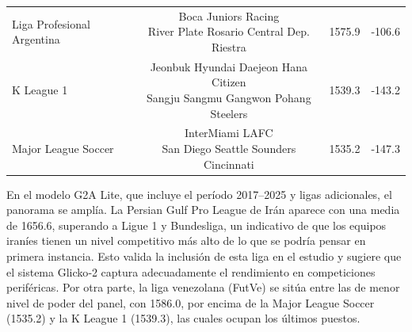 \begin{table}[htbp]
{\begin{tabular}{l c c c}
		Liga Profesional Argentina & \makecell[l]{Boca Juniors Racing \\ River Plate Rosario Central Dep. Riestra} & 1575.9 & -106.6 \\
		K League 1 & \makecell[l]{Jeonbuk Hyundai Daejeon Hana Citizen \\ Sangju Sangmu Gangwon Pohang Steelers} & 1539.3 & -143.2 \\
		Major League Soccer & \makecell[l]{InterMiami LAFC \\ San Diego Seattle Sounders Cincinnati} & 1535.2 & -147.3 \\
		\bottomrule
	\end{tabular}}%
\end{table}

En el modelo G2A Lite, que incluye el per\'iodo 2017--2025 y ligas adicionales, el panorama se ampl\'ia. La Persian Gulf Pro League de Ir\'an aparece con una media de 1656.6, superando a Ligue 1 y Bundesliga, un indicativo de que los equipos iran\'ies tienen un nivel competitivo m\'as alto de lo que se podr\'ia pensar en primera instancia. Esto valida la inclusi\'on de esta liga en el estudio y sugiere que el sistema Glicko‑2 captura adecuadamente el rendimiento en competiciones perif\'ericas. Por otra parte, la liga venezolana (FutVe) se sit\'ua entre las de menor nivel de poder del panel, con 1586.0, por encima de la Major League Soccer (1535.2) y la K League 1 (1539.3), las cuales ocupan los \'ultimos puestos.

